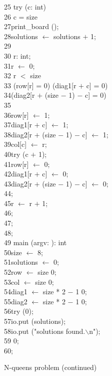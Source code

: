 \begin{appendix}
\begin{Program}
\begin{ttlprog}
25\>\ttlFun{} try (c: int)\\
26\>\>\ttlIf{} c = size \ttlThen{}\\
27\>\>\>print\_board ();\\
28\>\>\>solutions $\leftarrow$ solutions $+$ 1;\\
29\>\>\ttlElse{}\\
30\>\>\>\ttlVar{} r: int;\\
31\>\>\>r $\leftarrow$ 0;\\
32\>\>\>\ttlWhile{} r $<$ size \ttlDo{}\\
33\>\>\>\>\ttlIf{} (row[r] = 0) \ttlAnd{} (diag1[r $+$ c] = 0) \ttlAnd{} \\
34\>\>\>\>\>(diag2[r $+$ (size $-$ 1) $-$ c] = 0) \\
35\>\>\>\>\ttlThen{}\\
36\>\>\>\>\>row[r] $\leftarrow$ 1;\\
37\>\>\>\>\>diag1[r $+$ c] $\leftarrow$ 1;\\
38\>\>\>\>\>diag2[r $+$ (size $-$ 1) $-$ c] $\leftarrow$ 1;\\
39\>\>\>\>\>col[c] $\leftarrow$ r;\\
40\>\>\>\>\>try (c $+$ 1);\\
41\>\>\>\>\>row[r] $\leftarrow$ 0;\\
42\>\>\>\>\>diag1[r $+$ c] $\leftarrow$ 0;\\
43\>\>\>\>\>diag2[r $+$ (size $-$ 1) $-$ c] $\leftarrow$ 0;\\
44\>\>\>\>\ttlEnd{};\\
45\>\>\>\>r $\leftarrow$ r $+$ 1;\\
46\>\>\>\ttlEnd{};\\
47\>\>\ttlEnd{};\\
48\>\ttlEnd{};\\
49\>\ttlFun{} main (argv: \ttlList{} \ttlOf{} \ttlString{}): int\\
50\>\>size $\leftarrow$ 8;\\
51\>\>solutions $\leftarrow$ 0;\\
52\>\>row $\leftarrow$ \ttlArray{} size \ttlOf{} 0;\\
53\>\>col $\leftarrow$ \ttlArray{} size \ttlOf{} 0;\\
54\>\>diag1 $\leftarrow$ \ttlArray{} size * 2 $-$ 1 \ttlOf{} 0;\\
55\>\>diag2 $\leftarrow$ \ttlArray{} size * 2 $-$ 1 \ttlOf{} 0;\\
56\>\>try (0);\\
57\>\>io.put (solutions);\\
58\>\>io.put ("solutions found.$\backslash$n");\\
59\>\>\ttlReturn{} 0;\\
60\>\ttlEnd{};\\
\end{ttlprog}
\caption{N-queens problem (continued)}
\label{prog:example-queens2}
\end{Program}


\end{appendix}
